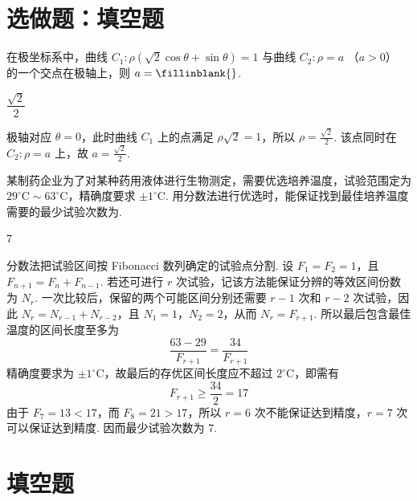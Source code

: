 \section{选做题：填空题}

\begin{problem}
在极坐标系中，曲线 \(C_{1}: \rho (\sqrt{2} \cos \theta + \sin \theta) = 1\) 与曲线 \(C_{2}: \rho = a\) （\(a > 0\)） 的一个交点在极轴上，则 \(a =\fillinblank{}\).
\end{problem}

\begin{answer}
\(\dfrac{\sqrt{2}}{2}\)
\end{answer}

\begin{solution}
极轴对应 \(\theta=0\)，此时曲线 \(C_{1}\) 上的点满足
\(\rho\sqrt2=1\)，所以 \(\rho=\frac{\sqrt2}{2}\). 该点同时在
\(C_2:\rho=a\) 上，故 \(a=\frac{\sqrt2}{2}\).
\end{solution}

\begin{problem}
某制药企业为了对某种药用液体进行生物测定，需要优选培养温度，试验范围定为 \(29^{\circ} \mathrm{C} \sim 63^{\circ} \mathrm{C}\)，精确度要求 \(\pm 1^{\circ} \mathrm{C}\). 用分数法进行优选时，能保证找到最佳培养温度需要的最少试验次数为\fillinblank{}.
\end{problem}

\begin{answer}
7
\end{answer}

\begin{solution}
分数法把试验区间按 Fibonacci 数列确定的试验点分割. 设
\(F_1=F_2=1\)，且 \(F_{n+1}=F_n+F_{n-1}\). 若还可进行 \(r\) 次试验，记该方法能保证分辨的等效区间份数为 \(N_r\). 一次比较后，保留的两个可能区间分别还需要 \(r-1\) 次和 \(r-2\) 次试验，因此
\(N_r=N_{r-1}+N_{r-2}\)，且 \(N_1=1\)，\(N_2=2\)，从而 \(N_r=F_{r+1}\). 所以最后包含最佳温度的区间长度至多为
\[
\frac{63-29}{F_{r+1}}=\frac{34}{F_{r+1}}
\]
精确度要求为 \(\pm1^\circ\mathrm C\)，故最后的存优区间长度应不超过 \(2^\circ\mathrm C\)，即需有
\[
F_{r+1}\geqslant\frac{34}{2}=17
\]
由于 \(F_7=13<17\)，而 \(F_8=21>17\)，所以 \(r=6\) 次不能保证达到精度，\(r=7\) 次可以保证达到精度. 因而最少试验次数为 \(7\).
\end{solution}

\section{填空题}


